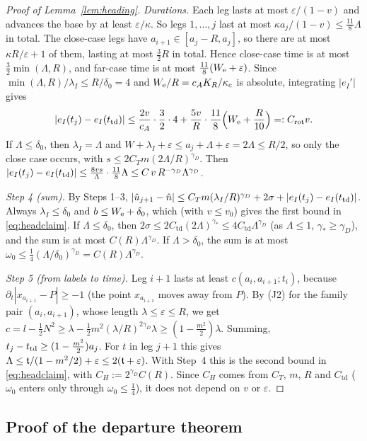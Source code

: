 \begin{proof}[Proof of Lemma~\ref{lem:heading}]
\emph{Durations.} Each leg lasts at most $\varepsilon/(1-v)$ and advances the base by at least $\varepsilon/\kappa$. So
legs $1,\dots,j$ last at most $\kappa a_j/(1-v)\le\frac{11}8\Lambda$ in total. The close-case legs have
$a_{i+1}\in[a_j-R,a_j]$, so there are at most $\kappa R/\varepsilon+1$ of them, lasting at most $\frac32R$ in total.
Hence close-case time is at most $\frac32\min(\Lambda,R)$, and far-case time is at most $\frac{11}8(W_{\mathrm{e}}+\varepsilon)$.
Since $\min(\Lambda,R)/\lambda_I\le R/\delta_0=4$ and $W_{\mathrm{e}}/R=c_AK_R/\kappa_c$ is absolute, integrating $|e_I'|$ gives
\[
|e_I(t_j)-e_I(t_{\mathrm{td}})|\le\frac{2v}{c_A}\cdot\frac32\cdot4+\frac{5v}R\cdot\frac{11}8\Bigl(W_{\mathrm{e}}+\frac R{10}\Bigr)=:C_{\mathrm{rot}}v .
\]
If $\Lambda\le\delta_0$, then $\lambda_I=\Lambda$ and $W+\lambda_I+\varepsilon\le a_j+\Lambda+\varepsilon=2\Lambda\le R/2$, so
only the close case occurs, with $s\le2C_Tm(2\Lambda/R)^{\gamma_D}$. Then
$|e_I(t_j)-e_I(t_{\mathrm{td}})|\le\frac{8vs}{\Lambda}\cdot\frac{11}8\Lambda\le C\,v\,R^{-\gamma_D}\Lambda^{\gamma_D}$.

\emph{Step 4 (sum).} By Steps 1--3,
$|\hat u_{j+1}-\hat n|\le C_Tm(\lambda_I/R)^{\gamma_D}+2\sigma+|e_I(t_j)-e_I(t_{\mathrm{td}})|$.
Always $\lambda_I\le\delta_0$ and $b\le W_{\mathrm{e}}+\delta_0$, which (with $v\le v_0$) gives the first bound in
\eqref{eq:headclaim}. If
$\Lambda\le\delta_0$, then $2\sigma\le2C_{\mathrm{td}}(2\Lambda)^{\gamma_*}\le4C_{\mathrm{td}}\Lambda^{\gamma_D}$ (as $\Lambda\le1$,
$\gamma_*\ge\gamma_D$), and the sum is at most $C(R)\Lambda^{\gamma_D}$. If $\Lambda>\delta_0$, the sum is at most
$\omega_0\le\frac14(\Lambda/\delta_0)^{\gamma_D}=C(R)\Lambda^{\gamma_D}$.

\emph{Step 5 (from labels to time).} Leg $i+1$ lasts at least $c(a_i,a_{i+1};t_i)$, because
$\partial_t|x_{a_{i+1}}-P|\ge-1$ (the point $x_{a_{i+1}}$ moves away from $P$). By (J2) for the family pair
$(a_i,a_{i+1})$, whose length $\lambda\le\varepsilon\le R$, we get $c=l-\frac12N^2\ge\lambda-\frac12m^2(\lambda/R)^{2\gamma_D}\lambda
\ge(1-\frac{m^2}2)\lambda$. Summing, $t_j-t_{\mathrm{td}}\ge(1-\frac{m^2}2)a_j$. For $t$ in leg $j+1$ this gives
$\Lambda\le\mathfrak{t}/(1-m^2/2)+\varepsilon\le2(\mathfrak{t}+\varepsilon)$. With Step~4 this is the second bound in
\eqref{eq:headclaim}, with $C_H:=2^{\gamma_D}C(R)$. Since $C_H$ comes from $C_T$, $m$, $R$ and $C_{\mathrm{td}}$
($\omega_0$ enters only through $\omega_0\le\frac14$), it does not depend on $v$ or $\varepsilon$.
\end{proof}

\subsection{Proof of the departure theorem}\label{appC:departure}

